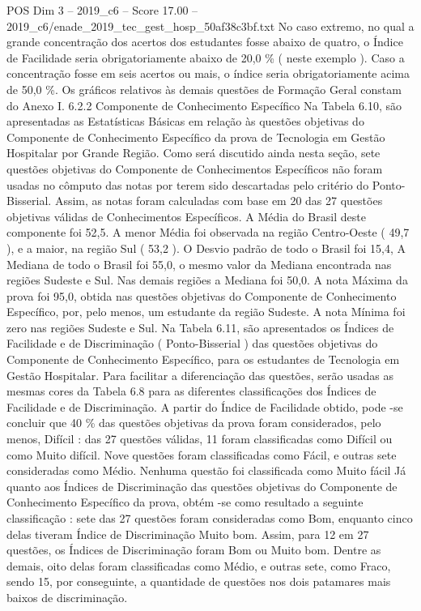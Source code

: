 \begin{textsample}{POS Dim 3 – 2019\_c6 – Score 17.00 – 2019\_c6/enade\_2019\_tec\_gest\_hosp\_50af38c3bf.txt}
No caso extremo, no qual a grande concentração dos acertos dos estudantes fosse abaixo de quatro, o Índice de Facilidade seria obrigatoriamente abaixo de 20,0 \% ( neste exemplo ).
Caso a concentração fosse em seis acertos ou mais, o índice seria obrigatoriamente acima de 50,0 \%.
Os gráficos relativos às demais questões de Formação Geral constam do Anexo I. 6.2.2 Componente de Conhecimento Específico Na Tabela 6.10, são apresentadas as Estatísticas Básicas em relação às questões objetivas do Componente de Conhecimento Específico da prova de Tecnologia em Gestão Hospitalar por Grande Região.
Como será discutido ainda nesta seção, sete questões objetivas do Componente de Conhecimentos Específicos não foram usadas no cômputo das notas por terem sido descartadas pelo critério do Ponto-Bisserial.
Assim, as notas foram calculadas com base em 20 das 27 questões objetivas válidas de Conhecimentos Específicos.
A Média do Brasil deste componente foi 52,5.
A menor Média foi observada na região Centro-Oeste ( 49,7 ), e a maior, na região Sul ( 53,2 ).
O Desvio padrão de todo o Brasil foi 15,4, A Mediana de todo o Brasil foi 55,0, o mesmo valor da Mediana encontrada nas regiões Sudeste e Sul.
Nas demais regiões a Mediana foi 50,0.
A nota Máxima da prova foi 95,0, obtida nas questões objetivas do Componente de Conhecimento Específico, por, pelo menos, um estudante da região Sudeste.
A nota Mínima foi zero nas regiões Sudeste e Sul.
Na Tabela 6.11, são apresentados os Índices de Facilidade e de Discriminação ( Ponto-Bisserial ) das questões objetivas do Componente de Conhecimento Específico, para os estudantes de Tecnologia em Gestão Hospitalar.
Para facilitar a diferenciação das questões, serão usadas as mesmas cores da Tabela 6.8 para as diferentes classificações dos Índices de Facilidade e de Discriminação.
A partir do Índice de Facilidade obtido, pode -se concluir que 40 \% das questões objetivas da prova foram considerados, pelo menos, Difícil : das 27 questões válidas, 11 foram classificadas como Difícil ou como Muito difícil.
Nove questões foram classificadas como Fácil, e outras sete consideradas como Médio.
Nenhuma questão foi classificada como Muito fácil Já quanto aos Índices de Discriminação das questões objetivas do Componente de Conhecimento Específico da prova, obtém -se como resultado a seguinte classificação : sete das 27 questões foram consideradas como Bom, enquanto cinco delas tiveram Índice de Discriminação Muito bom.
Assim, para 12 em 27 questões, os Índices de Discriminação foram Bom ou Muito bom.
Dentre as demais, oito delas foram classificadas como Médio, e outras sete, como Fraco, sendo 15, por conseguinte, a quantidade de questões nos dois patamares mais baixos de discriminação.

\end{textsample}
